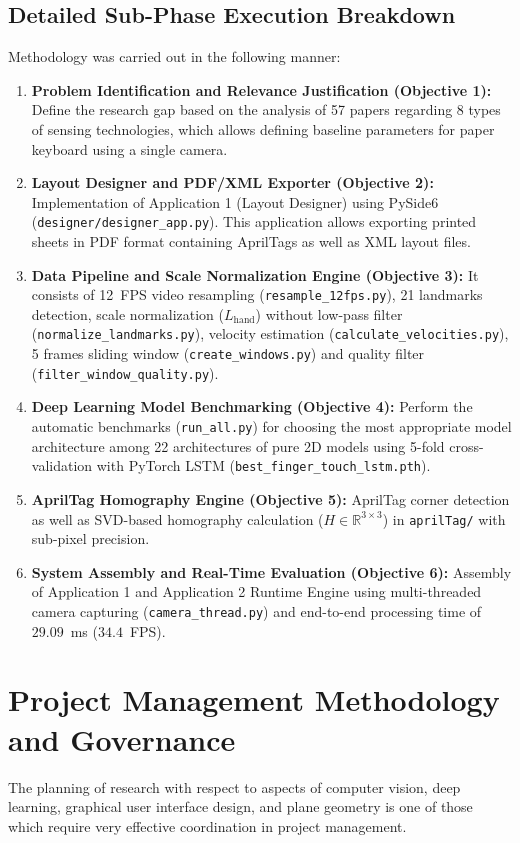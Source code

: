 \subsection{Detailed Sub-Phase Execution Breakdown}
\label{subsec:meth_subphase_details}
Methodology was carried out in the following manner:
\begin{enumerate}
    \item \textbf{Problem Identification and Relevance Justification (Objective 1):} Define the research gap based on the analysis of 57 papers regarding 8 types of sensing technologies, which allows defining baseline parameters for paper keyboard using a single camera.
    \item \textbf{Layout Designer and PDF/XML Exporter (Objective 2):} Implementation of Application 1 (Layout Designer) using PySide6 (\texttt{designer/designer\_app.py}). This application allows exporting printed sheets in PDF format containing AprilTags as well as XML layout files.
    \item \textbf{Data Pipeline and Scale Normalization Engine (Objective 3):} It consists of 12~FPS video resampling (\texttt{resample\_12fps.py}), 21 landmarks detection, scale normalization ($L_{\text{hand}}$) without low-pass filter (\texttt{normalize\_landmarks.py}), velocity estimation (\texttt{calculate\_velocities.py}), 5 frames sliding window (\texttt{create\_windows.py}) and quality filter (\texttt{filter\_window\_quality.py}).
    \item \textbf{Deep Learning Model Benchmarking (Objective 4):} Perform the automatic benchmarks (\texttt{run\_all.py}) for choosing the most appropriate model architecture among 22 architectures of pure 2D models using 5-fold cross-validation with PyTorch LSTM (\texttt{best\_finger\_touch\_lstm.pth}).
    \item \textbf{AprilTag Homography Engine (Objective 5):} AprilTag corner detection as well as SVD-based homography calculation ($H \in \mathbb{R}^{3 \times 3}$) in \texttt{aprilTag/} with sub-pixel precision.
    \item \textbf{System Assembly and Real-Time Evaluation (Objective 6):} Assembly of Application 1 and Application 2 Runtime Engine using multi-threaded camera capturing (\texttt{camera\_thread.py}) and end-to-end processing time of $29.09$~ms ($34.4$~FPS).
\end{enumerate}

\section{Project Management Methodology and Governance}
\label{sec:meth_project_management}
The planning of research with respect to aspects of computer vision, deep learning, graphical user interface design, and plane geometry is one of those which require very effective coordination in project management.

